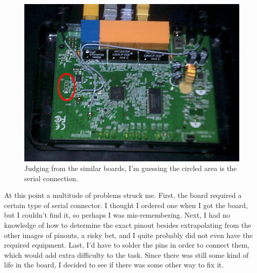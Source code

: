 \documentclass{article}
\begin{document}
\begin{figure}
\includegraphics{files/blog/2022_04_03_removing_extra_ip_protocols/2022_04_03_router2.jpg}
\caption{Judging from the similar boards, I'm guessing the circled area is the serial connection.}
\end{figure}

At this point a multitude of problems struck me.  First, the board required a certain type of serial connector.  I thought I ordered one when I got the board, but I couldn't find it, so perhaps I was mis-remembering.  Next, I had no knowledge of how to determine the exact pinout besides extrapolating from the other images of pinouts, a risky bet, and I quite probably did not even have the required equipment.  Last, I'd have to solder the pins in order to connect them, which would add extra difficulty to the task.  Since there was still some kind of life in the board, I decided to see if there was some other way to fix it.
\end{document}
